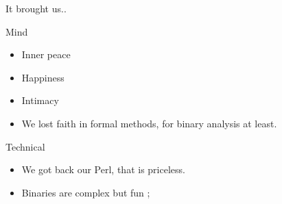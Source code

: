 \documentclass[11pt]{beamer}
\begin{document}
\begin{frame}{It brought us..}


\begin{block}{Mind}
	\begin{itemize}
		\item Inner peace
		\item Happiness
        \item Intimacy
        \item We lost faith in formal methods, for binary analysis at least.
	\end{itemize}
\end{block}

\begin{block}{Technical}
	\begin{itemize}
        \item We got back our Perl, that is priceless.
		\item Binaries are complex but fun ;
	\end{itemize}
	
\end{block}

\end{frame}
\end{document}
